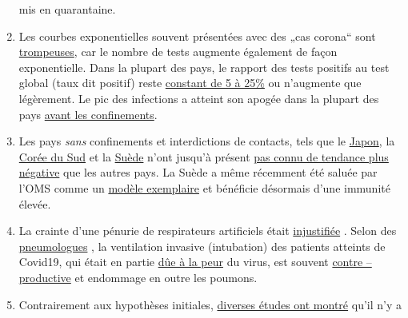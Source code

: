 \begin{enumerate}
  mis en quarantaine.
\item
  Les courbes exponentielles souvent présentées avec des „cas corona``
  sont
  \href{https://fivethirtyeight.com/features/coronavirus-case-counts-are-meaningless/}{trompeuses},
  car le nombre de tests augmente également de façon exponentielle. Dans
  la plupart des pays, le rapport des tests positifs au test global
  (taux dit positif) reste
  \href{https://swprs.org/rate-of-positive-covid19-tests/}{constant de 5
  à 25\%} ou n'augmente que légèrement. Le pic des infections a atteint
  son apogée dans la plupart des pays
  \href{https://www.dailymail.co.uk/news/article-8235979/UKs-coronavirus-crisis-peaked-lockdown-Expert-argues-draconian-measures-unnecessary.html}{avant
  les confinements}.
\item
  Les pays \emph{sans} confinements et interdictions de contacts, tels
  que le
  \href{https://www.japantimes.co.jp/news/2020/03/20/national/coronavirus-explosion-expected-japan/}{Japon},
  la
  \href{https://www.businessinsider.com/south-korea-coronavirus-testing-death-rate-2020-3?op=1}{Corée
  du Sud} et la
  \href{https://www.youtube.com/watch?v=bfN2JWifLCY}{Suède} n'ont
  jusqu'à présent
  \href{https://www.washingtontimes.com/news/2020/apr/15/sweden-coronavirus-rates-easing-despite-loose-rule/}{pas
  connu de tendance plus négative} que les autres pays. La Suède a même
  récemment été saluée par l'OMS comme un
  \href{https://nypost.com/2020/04/29/who-lauds-sweden-as-model-for-resisting-coronavirus-lockdown/}{modèle
  exemplaire} et bénéficie désormais d'une immunité élevée.
\item
  La crainte d'une pénurie de respirateurs artificiels était
  \href{https://off-guardian.org/2020/05/06/covid19-are-ventilators-killing-people/}{injustifiée}
  . Selon des
  \href{https://www.vpneumo.de/fileadmin/pdf/f2004071.007_Voshaar.pdf}{pneumologues}
  , la ventilation invasive (intubation) des patients atteints de
  Covid19, qui était en partie
  \href{https://www.dailymail.co.uk/news/article-8262351/Nurse-New-York-claims-city-killing-COVID-19-patients-putting-ventilators.html}{dûe
  à la peur} du virus, est souvent
  \href{https://off-guardian.org/2020/05/06/covid19-are-ventilators-killing-people/}{contre
  -- productive} et endommage en outre les poumons.
\item
  Contrairement aux hypothèses initiales,
  \href{https://www.who.int/news-room/commentaries/detail/modes-of-transmission-of-virus-causing-covid-19-implications-for-ipc-precaution-recommendations}{diverses
  études ont montré} qu'il n'y a

\end{enumerate}
